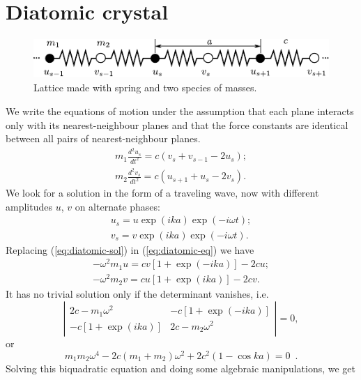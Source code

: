 \documentclass[12pt,letterpaper]{article}
\begin{document}
\section{Diatomic crystal}
\begin{figure}[h]
\centering
\includegraphics[height=1.5cm]{img/diatomic-crystal.pdf} 
\caption{Lattice made with spring and two species of masses.}
\end{figure}
We write the equations of motion under the assumption that each plane interacts only with its nearest-neighbour planes and that the force constants are identical between all pairs of nearest-neighbour planes.
\begin{subequations}
\begin{align}
m_1\frac{d^2 u_s}{dt^2} = c(v_s+v_{s-1}-2u_s); \\
m_2\frac{d^2 v_s}{dt^2} = c(u_{s+1}+u_{s}-2v_s).
\end{align}
\label{eq:diatomic-eq}
\end{subequations}
We look for a solution in the form of a traveling wave, now with different amplitudes $u$, $v$ on alternate phases:
\begin{subequations}
\begin{align}
u_s = u\exp(ika)\exp(-i\omega t); \\
v_s = v\exp(ika)\exp(-i\omega t).
\end{align}
\label{eq:diatomic-sol}
\end{subequations}
Replacing (\ref{eq:diatomic-sol}) in (\ref{eq:diatomic-eq}) we have
\begin{align*}
-\omega^2 m_1 u = cv[1+\exp(-ika)] - 2cu; \\
-\omega^2 m_2 v = cu[1+\exp(ika)] - 2cv.
\end{align*}
It has no trivial solution only if the determinant vanishes, i.e.
\[\left\vert \begin{array}{cc}
2c - m_1 \omega^2 & -c[1+\exp(-ika)] \\ 
-c[1+\exp(ika)] & 2c - m_2 \omega^2
\end{array}  \right\vert = 0,\]
or
\begin{equation}
m_1 m_2 \omega^4 - 2c(m_1 + m_2)\omega^2 + 2c^2(1-\cos ka)=0 \enspace .
\end{equation}
Solving this biquadratic equation and doing some algebraic manipulations, we get
\end{document}
